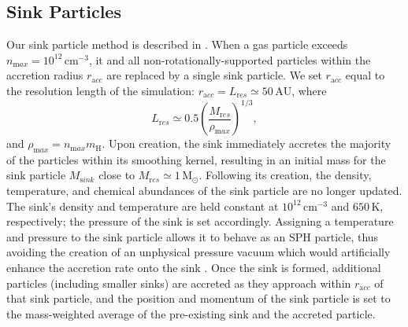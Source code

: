\documentclass{thesis}
\newcommand{\kelvin}{\ensuremath{\,\mathrm{K}}\xspace}
\newcommand{\cc}{\ensuremath{\,\mathrm{cm}^{-3}}\xspace}
\newcommand{\msun}{\ensuremath{\,\mathrm{M}_{\odot}}\xspace}
\newcommand{\au}{\ensuremath{\,\mathrm{AU}}\xspace}
\begin{document}
\subsection{Sink Particles}
\label{sinkParticles}
Our sink particle method is described in \citet{StacyGreifBromm2010}. 
When a gas particle exceeds $n_{\mathrm max} = 10^{12}\cc$, it and all non-rotationally-supported particles within the accretion radius $r_{\mathrm acc}$ are replaced by a single sink particle.  
We set $r_{\mathrm acc}$ equal to the resolution length of the simulation: $r_{\mathrm acc} = L_{\mathrm res} \simeq 50\au$, where 
\begin{equation}
L_{\mathrm res} \simeq 0.5 \left( \frac{M_{\mathrm res}}{\rho_{\mathrm max}} \right)^{1/3},
\end{equation}
and $\rho_{\mathrm max} = n_{\mathrm max} m_{\mathrm H}$.  
Upon creation, the sink immediately accretes the majority of the particles within its smoothing kernel, resulting in an initial mass for the sink particle $M_{\mathrm sink}$ close to $M_{\mathrm res} \simeq 1\msun$.  
Following its creation, the density, temperature, and chemical abundances of the sink particle are no longer updated.  
The sink's density and temperature are held constant at $10^{12}\cc$ and $650\kelvin$, respectively; the pressure of the sink is set accordingly. 
Assigning a temperature and pressure to the sink particle allows it to behave as an SPH particle, thus avoiding the creation of an unphysical pressure vacuum which would artificially enhance the accretion rate onto the sink \citep[see][]{BrommCoppiLarson2002, MartelEvansShapiro2006}. 
Once the sink is formed, additional particles (including smaller sinks) are accreted as they approach within $r_{\mathrm acc}$ of that sink particle, and the position and momentum of the sink particle is set to the mass-weighted average of the pre-existing sink and the accreted particle.
\end{document}
